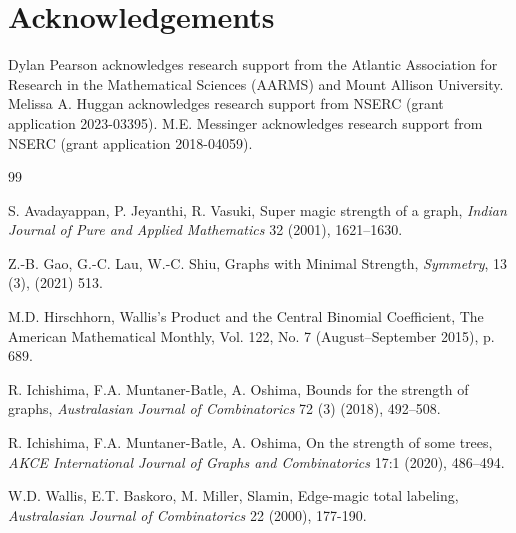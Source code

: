 \documentclass[12pt]{article}
\begin{document}
\medskip

\section*{Acknowledgements} 
Dylan Pearson acknowledges research support from the Atlantic Association for Research in the Mathematical Sciences (AARMS) and Mount Allison University. Melissa A. Huggan acknowledges research support from NSERC (grant application 2023-03395). M.E. Messinger acknowledges research support from NSERC (grant application 2018-04059). 


\begin{thebibliography}{99}

 S. Avadayappan, P. Jeyanthi, R. Vasuki, Super magic strength of a graph, \emph{Indian Journal of Pure and Applied Mathematics} 32 (2001), 1621–1630.

 Z.-B. Gao, G.-C. Lau, W.-C. Shiu, Graphs with Minimal Strength, \emph{Symmetry}, 13 (3), (2021) 513.

 M.D. Hirschhorn, Wallis's Product and the Central Binomial Coefficient, The American Mathematical Monthly, Vol. 122, No. 7 (August–September 2015), p. 689. 

 R. Ichishima, F.A. Muntaner-Batle, A. Oshima, Bounds for the strength of graphs, \emph{Australasian Journal of Combinatorics} 72 (3) (2018), 492–508.

 R. Ichishima, F.A. Muntaner-Batle, A. Oshima, On the strength of some trees, \emph{AKCE International Journal of Graphs and Combinatorics} 17:1 (2020), 486--494. 

 W.D. Wallis, E.T. Baskoro, M. Miller, Slamin, Edge-magic total labeling, \emph{Australasian Journal of Combinatorics} 22 (2000), 177-190.


\end{thebibliography}
\end{document}
